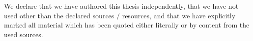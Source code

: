 
\vspace{3cm}

We declare that we have authored this thesis independently, that we have not used other than the declared sources / resources, and that we have explicitly marked all material which has been quoted either literally or by content from the used sources.

\vspace{5cm}

\noindent {} \hfill {}